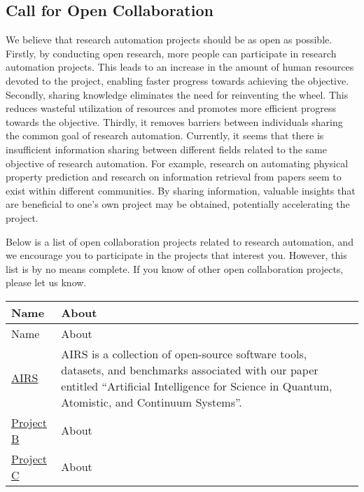 \subsection{Call for Open Collaboration}
We believe that research automation projects should be as open as possible. Firstly, by conducting open research, more people can participate in research automation projects. This leads to an increase in the amount of human resources devoted to the project, enabling faster progress towards achieving the objective. Secondly, sharing knowledge eliminates the need for reinventing the wheel. This reduces wasteful utilization of resources and promotes more efficient progress towards the objective. Thirdly, it removes barriers between individuals sharing the common goal of research automation. Currently, it seems that there is insufficient information sharing between different fields related to the same objective of research automation. For example, research on automating physical property prediction and research on information retrieval from papers seem to exist within different communities. By sharing information, valuable insights that are beneficial to one's own project may be obtained, potentially accelerating the project.

Below is a list of open collaboration projects related to research automation, and we encourage you to participate in the projects that interest you. However, this list is by no means complete. If you know of other open collaboration projects, please let us know.


\begin{longtable}{|l|p{8cm}|}
    \hline
    Name & About \\
    \hline
    \endfirsthead
    \hline
    Name & About \\
    \hline
    \endhead
    \href{https://www.air4.science/}{AIRS} & AIRS is a collection of open-source software tools, datasets, and benchmarks associated with our paper entitled “Artificial Intelligence for Science in Quantum, Atomistic, and Continuum Systems”.  \\
    \hline
    \href{http://www.example.com/projectB}{Project B} & About \\
    \hline
    \href{http://www.example.com/projectC}{Project C} & About \\
    \hline
\end{longtable}




